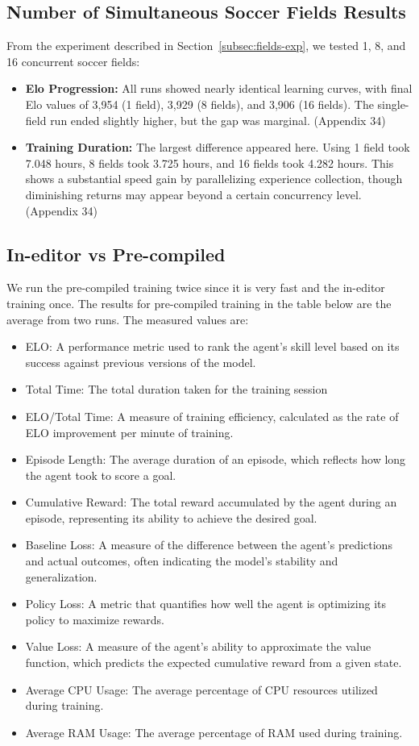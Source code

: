 \documentclass{LSkill}
\begin{document}
\subsection{Number of Simultaneous Soccer Fields Results}
\label{subsec:fields-results}
From the experiment described in Section~\ref{subsec:fields-exp}, we tested 1, 8, and 16 concurrent soccer fields:
\begin{itemize}
\item \textbf{Elo Progression:} All runs showed nearly identical learning curves, with final Elo values of 3,954 (1 field), 3,929 (8 fields), and 3,906 (16 fields). The single-field run ended slightly higher, but the gap was marginal. (Appendix 34)
\item \textbf{Training Duration:} The largest difference appeared here. Using 1 field took 7.048 hours, 8 fields took 3.725 hours, and 16 fields took 4.282 hours. This shows a substantial speed gain by parallelizing experience collection, though diminishing returns may appear beyond a certain concurrency level. (Appendix 34)
\end{itemize}
\subsection{In-editor vs Pre-compiled}
We run the pre-compiled training twice since it is very fast and the in-editor training once.
The results for pre-compiled training in the table below are the average from two runs. The measured values are:
\begin{itemize}
    \item ELO: A performance metric used to rank the agent's skill level based on its success against previous versions of the model.
    \item Total Time: The total duration taken for the training session
    \item ELO/Total Time: A measure of training efficiency, calculated as the rate of ELO improvement per minute of training.
    \item Episode Length: The average duration of an episode, which reflects how long the agent took to score a goal.
    \item Cumulative Reward: The total reward accumulated by the agent during an episode, representing its ability to achieve the desired goal.
    \item Baseline Loss: A measure of the difference between the agent's predictions and actual outcomes, often indicating the model's stability and generalization.
    \item Policy Loss: A metric that quantifies how well the agent is optimizing its policy to maximize rewards.
    \item Value Loss: A measure of the agent's ability to approximate the value function, which predicts the expected cumulative reward from a given state.
    \item Average CPU Usage: The average percentage of CPU resources utilized during training. 
    \item Average RAM Usage: The average percentage of RAM used during training.
\end{itemize}
\end{document}
